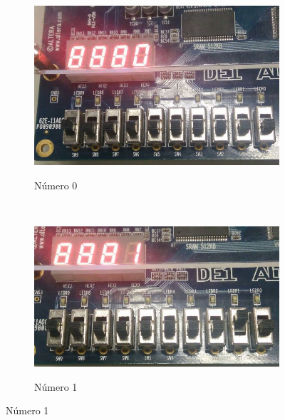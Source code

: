 		\begin{figure}[H]
			\centering

			\begin{subfigure}[b]{0.44\textwidth}
				\includegraphics[width=\textwidth]{img/etapa1/0}
				\label{fig:etapa1-0}
				\caption{Número 0}
			\end{subfigure}
			~
			\begin{subfigure}[b]{0.44\textwidth}
				\includegraphics[width=\textwidth]{img/etapa1/1}
				\label{fig:etapa1-1}
				\caption{Número 1}
			\end{subfigure}


\end{figure}
